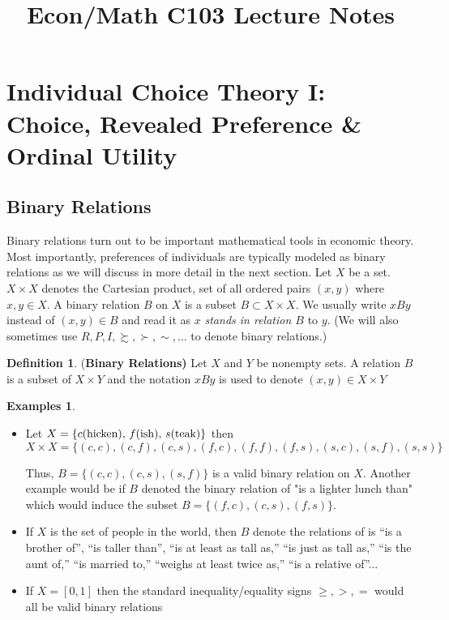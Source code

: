 \documentclass[12pt]{article}
\title{\textbf{Econ/Math C103 Lecture Notes}}
\author{}
\date{}
\theoremstyle{plain}
\theoremstyle{definition}
\newtheorem{defin}{Definition}[subsection]
\newtheorem{unex}[ex]{Examples}
\theoremstyle{remark}
\newcommand{\tn}[1]{\textnormal{#1}}
\newcommand{\3}{\vspace*{3mm}}
\newcommand{\name}[1]{\tn{(\textbf{#1)}}}
\newcommand{\pref}{\succsim}
\newcommand{\spref}{\succ}
\begin{document}
\maketitle
\tableofcontents




\newpage

\section{Individual Choice Theory I: Choice, Revealed Preference \& Ordinal Utility}
\subsection{Binary Relations}

Binary relations turn out to be important mathematical tools in economic theory. Most importantly, preferences of individuals are typically modeled as binary relations as we will discuss in more detail in the next section. Let $X$ be a set. $X \times X$ denotes the Cartesian product, set of all ordered pairs $(x, y)$ where $x, y \in X$. A binary relation $B$ on $X$ is a subset $B \subset X \times X$. We usually write $xBy$ instead of $(x, y) \in B$ and read it as $x$ \emph{stands in relation $B$} to $y$. (We will also sometimes use $R, P , I, \pref, \spref, \sim,$... to denote binary relations.)

\begin{defin} 

\name{Binary Relations} Let $X$ and $Y$ be nonempty sets. A relation $B$ is a subset of $X \times Y$ and the notation $x B y$ is used to denote $(x,y) \in X \times Y $

\end{defin}

\begin{unex}
\
\begin{itemize}
\item Let $X = \{\tn{$c$(hicken), $f$(ish), $s$(teak)} \}$ then 
\[ X \times X = \{(c,c), (c,f), (c,s), (f,c), (f,f), (f,s), (s,c), (s,f), (s,s)\}\]

Thus, $B = \{(c,c), (c,s), (s,f) \}$ is a valid binary relation on $X$. Another example would be if $B$ denoted the binary relation of "is a lighter lunch than" which would induce the subset $B = \{(f,c), (c,s), (f,s) \}$.

\item  If $X$ is the set of people in the world, then $B$ denote the relations of is “is a brother of”, “is taller than”, “is at
least as tall as,” “is just as tall as,” “is the aunt of,” “is married to,” “weighs at
least twice as,” “is a relative of”...

\item If $X = [0,1]$ then the standard inequality/equality signs $\geq, >, =$ would all be valid binary relations
\end{itemize}

\end{unex}
\end{document}
